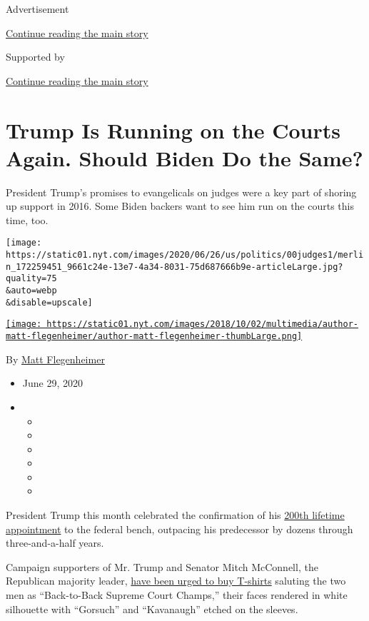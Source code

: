 Advertisement

\protect\hyperlink{after-top}{Continue reading the main story}

Supported by

\protect\hyperlink{after-sponsor}{Continue reading the main story}

\hypertarget{trump-is-running-on-the-courts-again-should-biden-do-the-same}{%
\section{Trump Is Running on the Courts Again. Should Biden Do the
Same?}\label{trump-is-running-on-the-courts-again-should-biden-do-the-same}}

President Trump's promises to evangelicals on judges were a key part of
shoring up support in 2016. Some Biden backers want to see him run on
the courts this time, too.

\texttt{[image: https://static01.nyt.com/images/2020/06/26/us/politics/00judges1/merlin\_172259451\_9661c24e-13e7-4a34-8031-75d687666b9e-articleLarge.jpg?quality=75\\\&auto=webp\\\&disable=upscale]}

\href{https://www.nytimes.com/by/matt-flegenheimer}{\texttt{[image: https://static01.nyt.com/images/2018/10/02/multimedia/author-matt-flegenheimer/author-matt-flegenheimer-thumbLarge.png]}}

By \href{https://www.nytimes.com/by/matt-flegenheimer}{Matt
Flegenheimer}

\begin{itemize}
\item
  June 29, 2020
\item
  \begin{itemize}
  \item
  \item
  \item
  \item
  \item
  \item
  \end{itemize}
\end{itemize}

President Trump this month celebrated the confirmation of his
\href{https://www.nytimes.com/2020/06/24/us/trump-senate-judges-wilson.html}{200th
lifetime appointment} to the federal bench, outpacing his predecessor by
dozens through three-and-a-half years.

Campaign supporters of Mr. Trump and Senator Mitch McConnell, the
Republican majority leader,
\href{https://www.washingtonpost.com/politics/trump-mcconnell-campaigns-sell-back-to-back-supreme-court-champs-t-shirts/2019/08/12/29b3eb72-bd3f-11e9-a5c6-1e74f7ec4a93_story.html}{have
been urged to buy T-shirts} saluting the two men as ``Back-to-Back
Supreme Court Champs,'' their faces rendered in white silhouette with
``Gorsuch'' and ``Kavanaugh'' etched on the sleeves.

